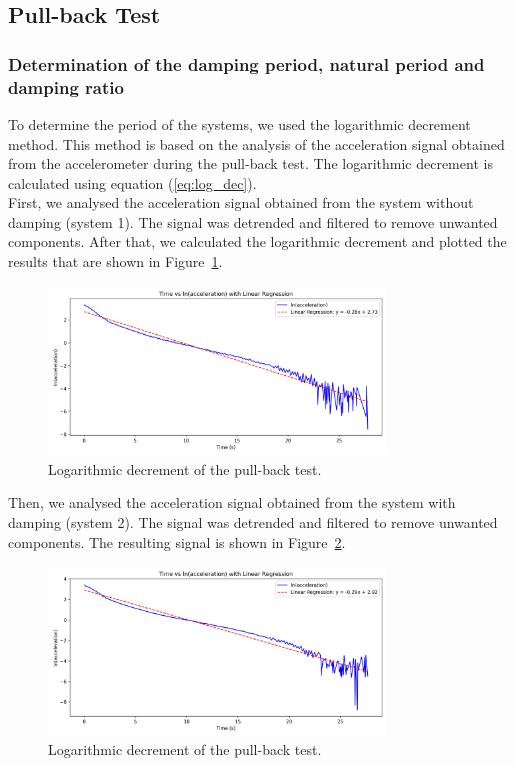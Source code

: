 \documentclass{article}  %
\begin{document}
\subsection{Pull-back Test}
\subsubsection{Determination of the damping period, natural period and damping ratio}
To determine the period of the systems, we used the logarithmic decrement method. This method is based on the analysis of the acceleration signal obtained from the accelerometer during the pull-back test. The logarithmic decrement is calculated using equation (\ref{eq:log_dec}).\\
First, we analysed the acceleration signal obtained from the system without damping (system 1). The signal was detrended and filtered to remove unwanted components. After that, we calculated the logarithmic decrement and plotted the results that are shown in Figure~\ref{fig:pullback1}.



\begin{figure}[h]
  \centering
  \includegraphics[width=0.8\textwidth]{GRAFICOS/regresion_lineal_first.png}
  \caption{Logarithmic decrement of the pull-back test.}
  \label{fig:pullback1}  
\end{figure}

Then, we analysed the acceleration signal obtained from the system with damping (system 2). The signal was detrended and filtered to remove unwanted components. The resulting signal is shown in Figure~\ref{fig:pullback2}.

\begin{figure}[h]
  \centering
  \includegraphics[width=0.8\textwidth]{GRAFICOS/regresion_lineal_second.png}
  \caption{Logarithmic decrement of the pull-back test.}
  \label{fig:pullback2}  
\end{figure}
\end{document}
